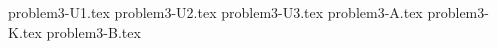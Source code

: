 \documentclass{article}
\begin{document}
{problem3-U1.tex}
{problem3-U2.tex}
{problem3-U3.tex}
{problem3-A.tex}
{problem3-K.tex}
{problem3-B.tex}
\end{document}
